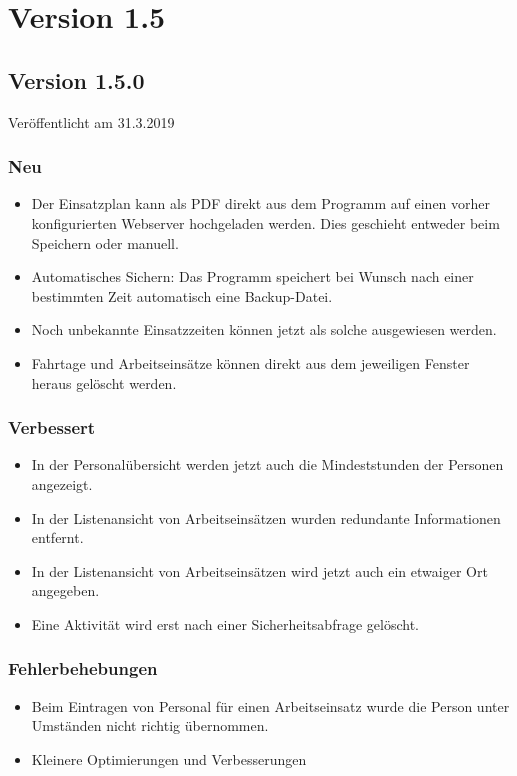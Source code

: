 \section{Version 1.5}\label{versionshistorie:1:5}
\subsection{Version 1.5.0}
\label{version:1:5:0}
Veröffentlicht am 31.3.2019
\subsubsection{Neu}
\begin{itemize}
  \item
  Der Einsatzplan kann als PDF direkt aus dem Programm auf einen vorher konfigurierten Webserver hochgeladen werden. Dies geschieht entweder beim Speichern oder manuell.
  \item
  Automatisches Sichern: Das Programm speichert bei Wunsch nach einer bestimmten Zeit automatisch eine Backup-Datei.
  \item
  Noch unbekannte Einsatzzeiten können jetzt als solche ausgewiesen werden.
  \item
  Fahrtage und Arbeitseinsätze können direkt aus dem jeweiligen Fenster heraus gelöscht werden.
\end{itemize}

\subsubsection{Verbessert}
\begin{itemize}
  \item
  In der Personalübersicht werden jetzt auch die Mindeststunden der Personen angezeigt.
  \item
  In der Listenansicht von Arbeitseinsätzen wurden redundante Informationen entfernt.
  \item
  In der Listenansicht von Arbeitseinsätzen wird jetzt auch ein etwaiger Ort angegeben.
  \item
  Eine Aktivität wird erst nach einer Sicherheitsabfrage gelöscht.
\end{itemize}

\subsubsection{Fehlerbehebungen}
\begin{itemize}
  \item
  Beim Eintragen von Personal für einen Arbeitseinsatz wurde die Person unter Umständen nicht richtig übernommen.
  \item
  Kleinere Optimierungen und Verbesserungen
\end{itemize}


